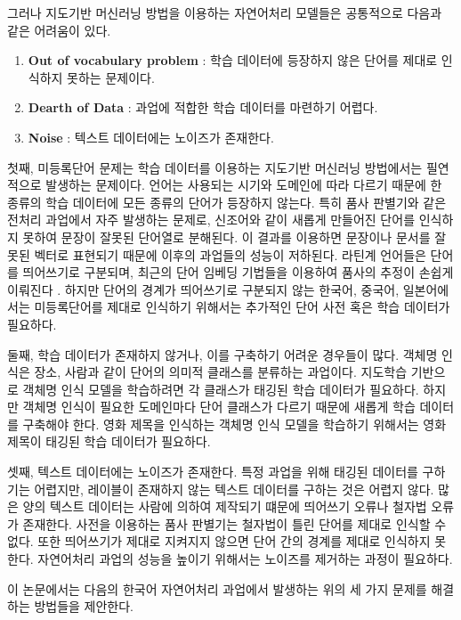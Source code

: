 \documentclass[11pt]{article}
\begin{document}
그러나 지도기반 머신러닝 방법을 이용하는 자연어처리 모델들은 공통적으로 다음과 같은 어려움이 있다.

\begin{enumerate}[noitemsep]
    \item \textbf{Out of vocabulary problem} : 학습 데이터에 등장하지 않은 단어를 제대로 인식하지 못하는 문제이다.
    \item \textbf{Dearth of Data} : 과업에 적합한 학습 데이터를 마련하기 어렵다.
    \item \textbf{Noise} : 텍스트 데이터에는 노이즈가 존재한다.
\end{enumerate}

첫째, 미등록단어 문제는 학습 데이터를 이용하는 지도기반 머신러닝 방법에서는 필연적으로 발생하는 문제이다.
언어는 사용되는 시기와 도메인에 따라 다르기 때문에 한 종류의 학습 데이터에 모든 종류의 단어가 등장하지 않는다.
특히 품사 판별기와 같은 전처리 과업에서 자주 발생하는 문제로, 신조어와 같이 새롭게 만들어진 단어를 인식하지 못하여 문장이 잘못된 단어열로 분해된다.
이 결과를 이용하면 문장이나 문서를 잘못된 벡터로 표현되기 때문에 이후의 과업들의 성능이 저하된다.
라틴계 언어들은 단어를 띄어쓰기로 구분되며, 최근의 단어 임베딩 기법들을 이용하여 품사의 추정이 손쉽게 이뤄진다 \citep{turian2010word, mikolov2013efficient, collobert2011natural}.
하지만 단어의 경계가 띄어쓰기로 구분되지 않는 한국어, 중국어, 일본어에서는 미등록단어를 제대로 인식하기 위해서는 추가적인 단어 사전 혹은 학습 데이터가 필요하다.

둘째, 학습 데이터가 존재하지 않거나, 이를 구축하기 어려운 경우들이 많다.
객체명 인식은 장소, 사람과 같이 단어의 의미적 클래스를 분류하는 과업이다.
지도학습 기반으로 객체명 인식 모델을 학습하려면 각 클래스가 태깅된 학습 데이터가 필요하다.
하지만 객체명 인식이 필요한 도메인마다 단어 클래스가 다르기 때문에 새롭게 학습 데이터를 구축해야 한다.
영화 제목을 인식하는 객체명 인식 모델을 학습하기 위해서는 영화 제목이 태깅된 학습 데이터가 필요하다.

셋째, 텍스트 데이터에는 노이즈가 존재한다.
특정 과업을 위해 태깅된 데이터를 구하기는 어렵지만, 레이블이 존재하지 않는 텍스트 데이터를 구하는 것은 어렵지 않다.
많은 양의 텍스트 데이터는 사람에 의하여 제작되기 떄문에 띄어쓰기 오류나 철자법 오류가 존재한다.
사전을 이용하는 품사 판별기는 철자법이 틀린 단어를 제대로 인식할 수 없다.
또한 띄어쓰기가 제대로 지켜지지 않으면 단어 간의 경계를 제대로 인식하지 못한다.
자연어처리 과업의 성능을 높이기 위해서는 노이즈를 제거하는 과정이 필요하다.

이 논문에서는 다음의 한국어 자연어처리 과업에서 발생하는 위의 세 가지 문제를 해결하는 방법들을 제안한다.
\end{document}
